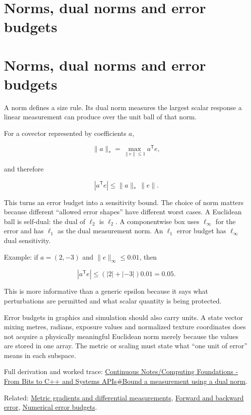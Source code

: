 \hypertarget{appendix-d6d9dbbe3c14}{}
\section*{Norms, dual norms and error budgets}
\section{Norms, dual norms and error budgets}\label{norms-dual-norms-and-error-budgets}

A norm defines a size rule. Its dual norm measures the largest scalar response a linear measurement can produce over the unit ball of that norm.

For a covector represented by coefficients \(a\),

\[
\|a\|_* = \max_{\|e\|\le 1} a^{\mathsf T}e,
\]

and therefore

\[
|a^{\mathsf T}e|\le \|a\|_*\,\|e\|.
\]

This turns an error budget into a sensitivity bound. The choice of norm matters because different ``allowed error shapes'' have different worst cases. A Euclidean ball is self-dual: the dual of \(\ell_2\) is \(\ell_2\). A componentwise box uses \(\ell_\infty\) for the error and has \(\ell_1\) as the dual measurement norm. An \(\ell_1\) error budget has \(\ell_\infty\) dual sensitivity.

Example: if \(a=(2,-3)\) and \(\|e\|_\infty\le0.01\), then

\[
|a^{\mathsf T}e|
\le (|2|+|{-3}|)0.01
=0.05.
\]

This is more informative than a generic epsilon because it says what perturbations are permitted and what scalar quantity is being protected.

Error budgets in graphics and simulation should also carry units. A state vector mixing metres, radians, exposure values and normalized texture coordinates does not acquire a physically meaningful Euclidean norm merely because the values are stored in one array. The metric or scaling must state what ``one unit of error'' means in each subspace.

Full derivation and worked trace: \href{Continuous\%20Notes/Computing\%20Foundations\%20-\%20From\%20Bits\%20to\%20C++\%20and\%20Systems\%20APIs\#Bound\%20a\%20measurement\%20using\%20a\%20dual\%20norm}{Continuous Notes/Computing Foundations - From Bits to C++ and Systems APIs\#Bound a measurement using a dual norm}.

Related: \hyperref[appendix-f4acdb1d5563]{Metric gradients and differential measurements}, \hyperref[appendix-a7fbaf6d1b1c]{Forward and backward error}, \hyperref[appendix-31b8c295e05f]{Numerical error budgets}.
